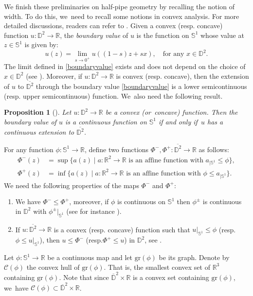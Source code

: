 \documentclass[11pt]{article}
\newcommand{\resp}{resp.\xspace}
\let\ra\rightarrow
\theoremstyle{plain}
\newtheorem{prop}[cor]{Proposition}
\theoremstyle{definition}
\begin{document}
We finish these preliminaries on half-pipe geometry by recalling the notion of width. To do this, we~need to recall some notions in convex analysis. For more detailed discussions, readers can refer to \cite{Rockconvex}.
Given a convex (\resp concave) function $u:\mathbb{D}^2\to \mathbb{R}$, the \emph{boundary value} of $u$ is the function on $\mathbb{S}^1$ whose value at $z\in\mathbb{S}^1$ is given by: \begin{equation}\label{boundaryvalue}
u(z) = \lim_{s \to 0^+}u((1-s)z+sx),\quad\text{for any } x\in\mathbb{D}^2.
\end{equation}
The limit defined in \eqref{boundaryvalue} exists and does not depend on the choice of $x\in \mathbb{D}^2$ (see \cite[\S 4]{ConvexAnal}). Moreover, if $u:\mathbb{D}^2\to\mathbb{R}$ is convex (\resp concave), then the extension of $u$ to $\overline{\mathbb{D}^2}$ through the boundary value \eqref{boundaryvalue} is a lower semicontinuous (\resp upper semicontinuous) function. We~also need the following result.
\begin{prop}[{\cite[Prop.\,4.2]{ConvexAnal}}]
\label{boundaryvalueextension}
Let $u: \mathbb{D}^2\to\mathbb{R}$ be a convex (or~concave) function. Then the boundary value of $u$ is a continuous function on $\mathbb{S}^1$ if and only if~$u$ has a continuous extension to $\overline{\mathbb{D}^2}$.
\end{prop}
For any function $\phi: \mathbb{S}^1 \to \mathbb{R}$, define two functions $\Phi^-, \Phi^+: \overline{\mathbb{D}^2} \to \mathbb{R}$ as follows:\vspace*{-3pt}
\begin{align}\label{phi-}
\Phi^-(z)&=\sup\{ a(z)\mid a:\mathbb{R}^2\ra\mathbb{R} \text{ is an affine function with } a_{\mid\mathbb{S}^1}\leq\phi \},
\\
\label{phi+}
\Phi^+(z)&=\inf\{ a(z)\mid a:\mathbb{R}^2\ra\mathbb{R} \text{ is an affine function with } \phi\leq a_{\mid\mathbb{S}^1} \}.
\end{align}
We need the following properties of the maps $\Phi^-$ and $\Phi^+$:\label{page 8}
\begin{enumerate}
\item[(P1)]\label{P1}
We have $\Phi^-\leq\Phi^+$, moreover, if $\phi$ is continuous on $\mathbb{S}^1$ then $\phi^{\pm}$ is continuous in $\mathbb{D}^2$ with $\phi^{\pm}|_{\mathbb{S}^1}$ (see for instance \cite[Lem.\,4.6]{ConvexAnal}).
\item[(P2)]\label{P2} If $u:\overline{\mathbb{D}^2}\to\mathbb{R}$ is a convex (\resp concave) function such that $u |_{\mathbb{S}^1}\leq \phi$ (\resp $\phi\leq u |_{\mathbb{S}^1} $), then $u\leq\Phi^-$ (\resp $\Phi^+\leq u$) in $\mathbb{D}^2$, see \cite[Cor.\,4.5]{ConvexAnal}.
\end{enumerate}
Let $\phi:\mathbb{S}^1\to\mathbb{R}$ be a continuous map and let $\mathrm{gr}(\phi)$ be its graph. Denote by $\mathcal{C}(\phi)$ the convex hull of $\mathrm{gr}(\phi)$. That is, the smallest convex set of $\mathbb{R}^3$ containing $\mathrm{gr}(\phi)$. Note that since $\overline{\mathbb{D}}^2\times\mathbb{R}$ is a convex set containing $\mathrm{gr}(\phi)$, we~have $\mathcal{C}(\phi)\subset\overline{\mathbb{D}}^2\times\mathbb{R}$.
\end{document}
